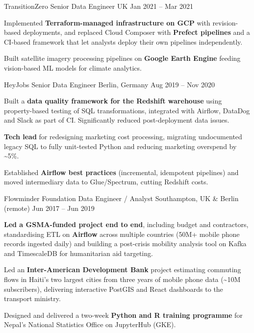 \begin{cventries}
  \cventry
    {TransitionZero}
    {Senior Data Engineer}
    {UK} %
    {Jan 2021 -- Mar 2021} %
    {
      \begin{cvitems} %
        \item {Implemented \textbf{Terraform-managed infrastructure on GCP} with revision-based deployments, and replaced Cloud Composer with \textbf{Prefect pipelines} and a CI-based framework that let analysts deploy their own pipelines independently.}
        \item {Built satellite imagery processing pipelines on \textbf{Google Earth Engine} feeding vision-based ML models for climate analytics.}
      \end{cvitems}
    }

  \cventry
    {HeyJobs}
    {Senior Data Engineer}
    {Berlin, Germany} %
    {Aug 2019 -- Nov 2020} %
    {
      \begin{cvitems} %
        \item {Built a \textbf{data quality framework for the Redshift warehouse} using property-based testing of SQL transformations, integrated with Airflow, DataDog and Slack as part of CI. Significantly reduced post-deployment data issues.}
        \item {\textbf{Tech lead} for redesigning marketing cost processing, migrating undocumented legacy SQL to fully unit-tested Python and reducing marketing overspend by \textasciitilde 5\%.}
        \item {Established \textbf{Airflow best practices} (incremental, idempotent pipelines) and moved intermediary data to Glue/Spectrum, cutting Redshift costs.}
      \end{cvitems}
    }

  \cventry
    {Flowminder Foundation}
    {Data Engineer / Analyst}
    {Southampton, UK \& Berlin (remote)} %
    {Jun 2017 -- Jun 2019} %
    {
      \begin{cvitems} %
        \item {\textbf{Led a GSMA-funded project end to end}, including budget and contractors, standardising ETL on \textbf{Airflow} across multiple countries (50M+ mobile phone records ingested daily) and building a post-crisis mobility analysis tool on Kafka and TimescaleDB for humanitarian aid targeting.}
        \item {Led an \textbf{Inter-American Development Bank} project estimating commuting flows in Haiti's two largest cities from three years of mobile phone data (\textasciitilde 10M subscribers), delivering interactive PostGIS and React dashboards to the transport ministry.}
        \item {Designed and delivered a two-week \textbf{Python and R training programme} for Nepal's National Statistics Office on JupyterHub (GKE).}
      \end{cvitems}
    }


\end{cventries}
